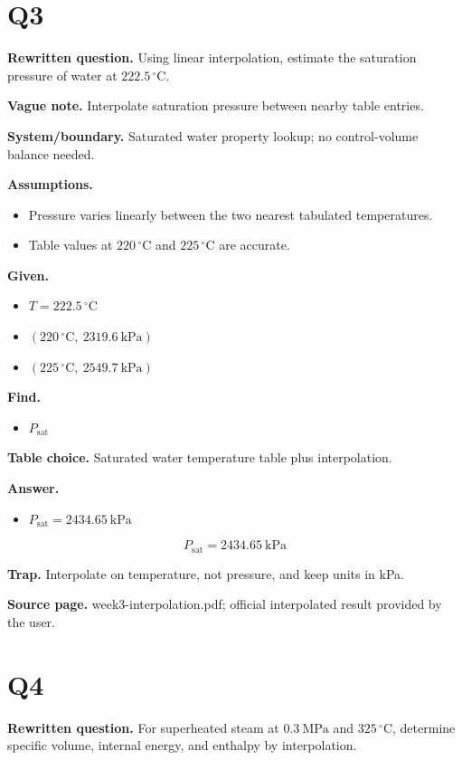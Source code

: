 \section*{Q3}
\textbf{Rewritten question.} Using linear interpolation, estimate the saturation pressure of water at $222.5\,^{\circ}\mathrm{C}$.

\textbf{Vague note.} Interpolate saturation pressure between nearby table entries.

\textbf{System/boundary.} Saturated water property lookup; no control-volume balance needed.

\textbf{Assumptions.}
\begin{itemize}
  \item Pressure varies linearly between the two nearest tabulated temperatures.
  \item Table values at $220\,^{\circ}\mathrm{C}$ and $225\,^{\circ}\mathrm{C}$ are accurate.
\end{itemize}

\textbf{Given.}
\begin{itemize}
  \item $T = 222.5\,^{\circ}\mathrm{C}$
  \item $(220\,^{\circ}\mathrm{C},\ 2319.6\ \mathrm{kPa})$
  \item $(225\,^{\circ}\mathrm{C},\ 2549.7\ \mathrm{kPa})$
\end{itemize}

\textbf{Find.}
\begin{itemize}
  \item $P_{\mathrm{sat}}$
\end{itemize}

\textbf{Table choice.} Saturated water temperature table plus interpolation.

\textbf{Answer.}
\begin{itemize}
  \item $P_{\mathrm{sat}} = 2434.65\ \mathrm{kPa}$
\end{itemize}

\[\boxed{P_{\mathrm{sat}} = 2434.65\ \mathrm{kPa}}\]

\textbf{Trap.} Interpolate on temperature, not pressure, and keep units in kPa.

\textbf{Source page.} week3-interpolation.pdf; official interpolated result provided by the user.

\section*{Q4}
\textbf{Rewritten question.} For superheated steam at $0.3\ \mathrm{MPa}$ and $325\,^{\circ}\mathrm{C}$, determine specific volume, internal energy, and enthalpy by interpolation.


